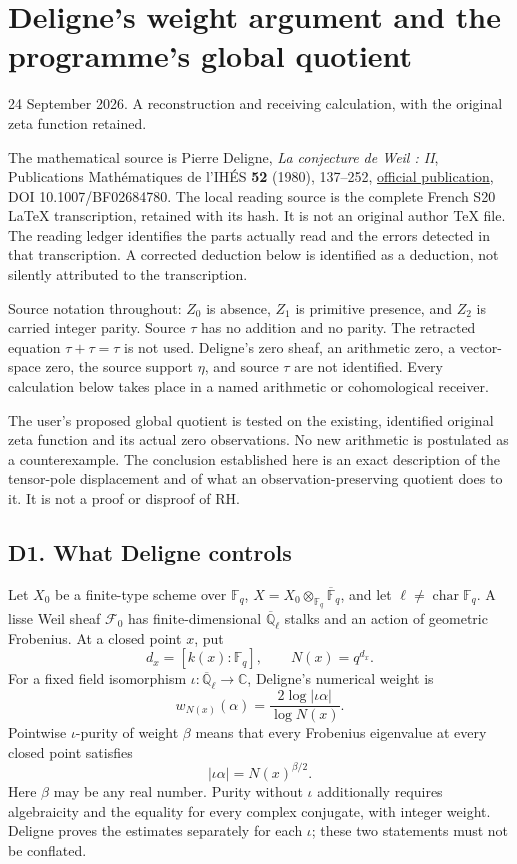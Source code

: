 \section{Deligne's weight argument and the programme's global
quotient}\label{delignes-weight-argument-and-the-programmes-global-quotient}

24 September 2026. A reconstruction and receiving calculation, with the
original zeta function retained.

The mathematical source is Pierre Deligne, \emph{La conjecture de Weil :
II}, Publications Mathématiques de l'IHÉS \textbf{52} (1980), 137--252,
\href{https://www.numdam.org/item/PMIHES_1980__52__137_0/}{official
publication}, DOI 10.1007/BF02684780. The local reading source is the
complete French S20 LaTeX transcription, retained with its hash. It is
not an original author TeX file. The reading ledger identifies the parts
actually read and the errors detected in that transcription. A corrected
deduction below is identified as a deduction, not silently attributed to
the transcription.

Source notation throughout: \(Z_0\) is absence, \(Z_1\) is primitive
presence, and \(Z_2\) is carried integer parity. Source \(\tau\) has no
addition and no parity. The retracted equation \(\tau+\tau=\tau\) is not
used. Deligne's zero sheaf, an arithmetic zero, a vector-space zero, the
source support \(\eta\), and source \(\tau\) are not identified. Every
calculation below takes place in a named arithmetic or cohomological
receiver.

The user's proposed global quotient is tested on the existing,
identified original zeta function and its actual zero observations. No
new arithmetic is postulated as a counterexample. The conclusion
established here is an exact description of the tensor-pole displacement
and of what an observation-preserving quotient does to it. It is not a
proof or disproof of RH.

\subsection{D1. What Deligne controls}\label{d1.-what-deligne-controls}

Let \(X_0\) be a finite-type scheme over \(\mathbb F_q\),
\(X=X_0\otimes_{\mathbb F_q}\overline{\mathbb F}_q\), and let
\(\ell\ne\operatorname{char}\mathbb F_q\). A lisse Weil sheaf
\(\mathcal F_0\) has finite-dimensional \(\overline{\mathbb Q}_\ell\)
stalks and an action of geometric Frobenius. At a closed point \(x\),
put \[
d_x=[k(x):\mathbb F_q],\qquad N(x)=q^{d_x}.
\] For a fixed field isomorphism
\(\iota:\overline{\mathbb Q}_\ell\to\mathbb C\), Deligne's numerical
weight is \[
w_{N(x)}(\alpha)=\frac{2\log|\iota\alpha|}{\log N(x)}.
\tag{D1.1}
\] Pointwise \(\iota\)-purity of weight \(\beta\) means that every
Frobenius eigenvalue at every closed point satisfies \[
|\iota\alpha|=N(x)^{\beta/2}.
\tag{D1.2}
\] Here \(\beta\) may be any real number. Purity without \(\iota\)
additionally requires algebraicity and the equality for every complex
conjugate, with integer weight. Deligne proves the estimates separately
for each \(\iota\); these two statements must not be conflated.

